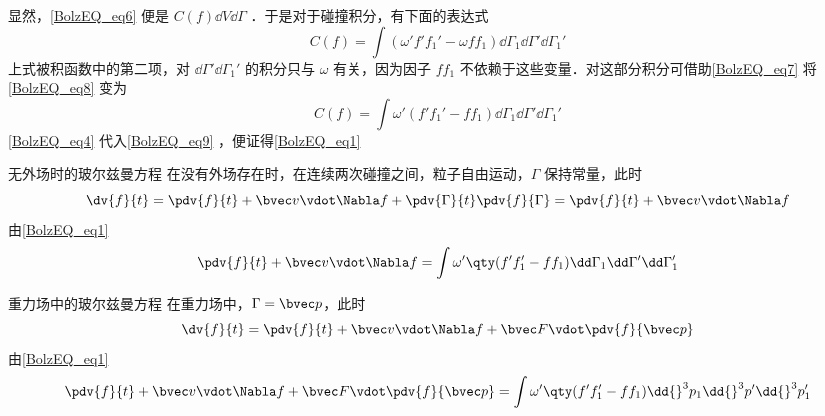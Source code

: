 显然，\autoref{BolzEQ_eq6} 便是 $C(f)\dd V\dd\Gamma$ ．于是对于碰撞积分，有下面的表达式
\begin{equation}\label{BolzEQ_eq8}
C(f)=\int(\omega'f'f_1'-\omega f f_1)\dd\Gamma_1\dd\Gamma'\dd\Gamma_1'
\end{equation}
上式被积函数中的第二项，对 $\dd\Gamma'\dd\Gamma_1'$ 的积分只与 $\omega$ 有关，因为因子 $ff_1$ 不依赖于这些变量．对这部分积分可借助\autoref{BolzEQ_eq7} 将\autoref{BolzEQ_eq8} 变为
\begin{equation}\label{BolzEQ_eq9}
C(f)=\int\omega'(f'f_1'- f f_1)\dd\Gamma_1\dd\Gamma'\dd\Gamma_1'
\end{equation}
\autoref{BolzEQ_eq4} 代入\autoref{BolzEQ_eq9} ，便证得\autoref{BolzEQ_eq1} 
\begin{example}{无外场时的玻尔兹曼方程}
在没有外场存在时，在连续两次碰撞之间，粒子自由运动，$\Gamma$ 保持常量，此时
\begin{equation}
\dv{f}{t}=\pdv{f}{t}+\bvec v\vdot \Nabla f+\pdv{\Gamma}{t}\pdv{f}{\Gamma}=\pdv{f}{t}+\bvec v\vdot \Nabla f
\end{equation}
由\autoref{BolzEQ_eq1} 
\begin{equation}
\pdv{f}{t}+\bvec v\vdot \Nabla f=\int\omega'\qty(f'f_1'-ff_1)\dd\Gamma_1\dd\Gamma'\dd\Gamma_1'
\end{equation}
\end{example}
\begin{example}{重力场中的玻尔兹曼方程}
在重力场中，$\Gamma=\bvec p$，此时
\begin{equation}
\dv{f}{t}=\pdv{f}{t}+\bvec v\vdot \Nabla f+\bvec F\vdot\pdv{f}{\bvec p}
\end{equation}
由\autoref{BolzEQ_eq1} 
\begin{equation}
\pdv{f}{t}+\bvec v\vdot \Nabla f+\bvec F\vdot\pdv{f}{\bvec p}=\int\omega'\qty(f'f_1'-ff_1)\dd{}^3  p_1\dd {}^3p'\dd{}^3 p_1'
\end{equation}
\end{example}